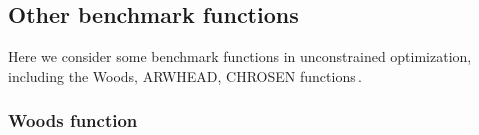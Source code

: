 \documentclass[final,1p,times]{elsarticle}
\begin{document}
\subsection{Other benchmark functions}

Here we consider some benchmark functions in unconstrained
optimization, including the Woods, ARWHEAD, CHROSEN
functions\,\cite{lukvsan2010modified, powell2006newuoa,
andrei2008unconstrained}.

%
%


\subsubsection{Woods function}
\label{subsec:woods}
\end{document}
